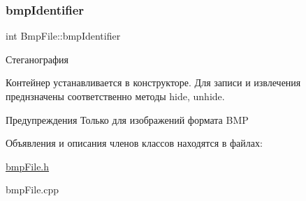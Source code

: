 \subsubsection{\texorpdfstring{bmp\+Identifier}{bmpIdentifier}}
{\footnotesize\ttfamily int Bmp\+File\+::bmp\+Identifier}



Стеганография 

Контейнер устанавливается в конструкторе. Для записи и извлечения преднзначены соответственно методы hide, unhide. \begin{DoxyWarning}{Предупреждения}
Только для изображений формата B\+MP 
\end{DoxyWarning}


Объявления и описания членов классов находятся в файлах\+:\begin{DoxyCompactItemize}
\item 
\hyperlink{bmpFile_8h}{bmp\+File.\+h}\item 
bmp\+File.\+cpp\end{DoxyCompactItemize}
